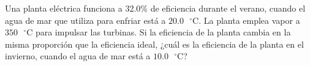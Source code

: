 \item Una planta eléctrica funciona a 32.0\% de eficiencia durante el verano, cuando el agua de mar que utiliza para enfriar está a $20.0\text{ }^\circ\text{C}$. La planta emplea vapor a $350\text{ }^\circ\text{C}$ para impulsar las turbinas. Si la eficiencia de la planta cambia en la misma proporción que la eficiencia ideal, ¿cuál es la eficiencia de la planta en el invierno, cuando el agua de mar está a $10.0\text{ }^\circ\text{C}$?
